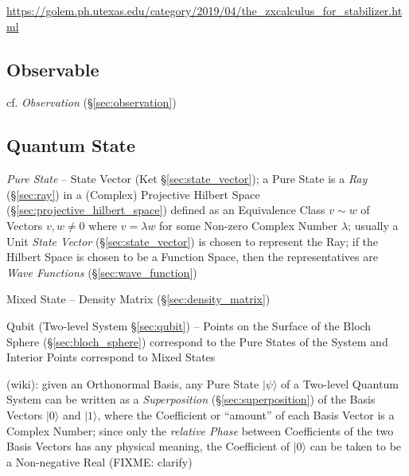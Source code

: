 \url{https://golem.ph.utexas.edu/category/2019/04/the_zxcalculus_for_stabilizer.html}



\subsection{Observable}\label{sec:observable}

cf. \emph{Observation} (\S\ref{sec:observation})



\subsection{Quantum State}\label{sec:quantum_state}

\emph{Pure State} -- State Vector (Ket \S\ref{sec:state_vector}); a Pure State
is a \emph{Ray} (\S\ref{sec:ray}) in a (Complex) Projective Hilbert Space
(\S\ref{sec:projective_hilbert_space}) defined as an Equivalence Class $v \sim
w$ of Vectors $v, w \neq 0$ where $v = \lambda w$ for some Non-zero Complex
Number $\lambda$; usually a Unit \emph{State Vector} (\S\ref{sec:state_vector})
is chosen to represent the Ray; if the Hilbert Space is chosen to be a Function
Space, then the representatives are \emph{Wave Functions}
(\S\ref{sec:wave_function})

Mixed State -- Density Matrix (\S\ref{sec:density_matrix})

Qubit (Two-level System \S\ref{sec:qubit}) -- Points on the Surface of the Bloch
Sphere (\S\ref{sec:bloch_sphere}) correspond to the Pure States of the System
and Interior Points correspond to Mixed States

(wiki): given an Orthonormal Basis, any Pure State $|\psi\rangle$ of a Two-level
Quantum System can be written as a \emph{Superposition}
(\S\ref{sec:superposition}) of the Basis Vectors $|0\rangle$ and $|1\rangle$,
where the Coefficient or ``amount'' of each Basis Vector is a Complex Number;
since only the \emph{relative Phase} between Coefficients of the two Basis
Vectors has any physical meaning, the Coefficient of $|0\rangle$ can be taken
to be a Non-negative Real (FIXME: clarify)

\asterism

